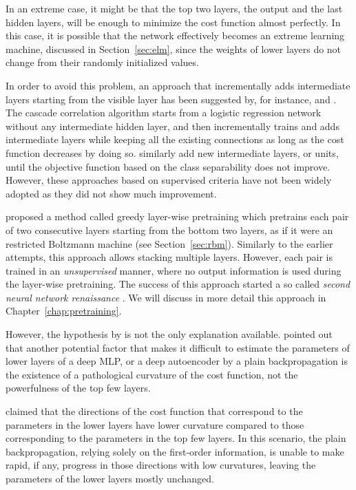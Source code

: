 \documentclass[dissertation,nocontribution,draft*]{aaltoseries}
\begin{document}
In an extreme case, it might be that the top two layers, the
output and the last hidden layers, will be enough to minimize
the cost function almost perfectly. In this case, it is
possible that the network effectively becomes an extreme
learning machine, discussed in Section~\ref{sec:elm}, since
the weights of lower layers do not change from their
randomly initialized values. 

In order to avoid this problem, an approach that
incrementally adds intermediate layers starting from the
visible layer has been suggested by, for instance,
\citet{Fahlman1990} and \citet{Lengelle1996}.  The cascade
correlation algorithm \citep{Fahlman1990} starts from a
logistic regression network without any intermediate hidden
layer, and then incrementally trains and adds intermediate
layers while keeping all the existing connections as long as
the cost function decreases by doing so.
\citet{Lengelle1996} similarly add new intermediate layers,
or units, until the objective function based on the class
separability does not improve.  However, these approaches
based on supervised criteria have not been widely adopted as
they did not show much improvement.

\citet{Hinton2006} proposed a method called greedy
layer-wise pretraining which pretrains each pair of two
consecutive layers starting from the bottom two layers, as
if it were an restricted Boltzmann machine (see
Section~\ref{sec:rbm}). Similarly to the earlier attempts,
this approach allows stacking multiple layers. However, each
pair is trained in an \textit{unsupervised} manner, where
no output information is used during the layer-wise
pretraining. The success of this approach started a so
called \textit{second neural network renaissance}
\citep{Schmidhuber2011}.  We will discuss in more detail this
approach in Chapter~\ref{chap:pretraining}.

However, the hypothesis by \citet{Bengio2007nips} is not the
only explanation available.  \citet{Martens2010} pointed
out that another potential factor that makes it difficult to
estimate the parameters of lower layers of a deep MLP, or a
deep autoencoder by a plain backpropagation is the existence
of a pathological curvature of the cost function, not the
powerfulness of the top few layers. 

\citet{Martens2010} claimed that the directions of the cost
function that correspond to the parameters in the lower
layers have lower curvature compared to those corresponding
to the parameters in the top few layers. In this scenario,
the plain backpropagation, relying solely on the first-order
information, is unable to make rapid, if any, progress in
those directions with low curvatures, leaving the parameters
of the lower layers mostly unchanged.
\end{document}
